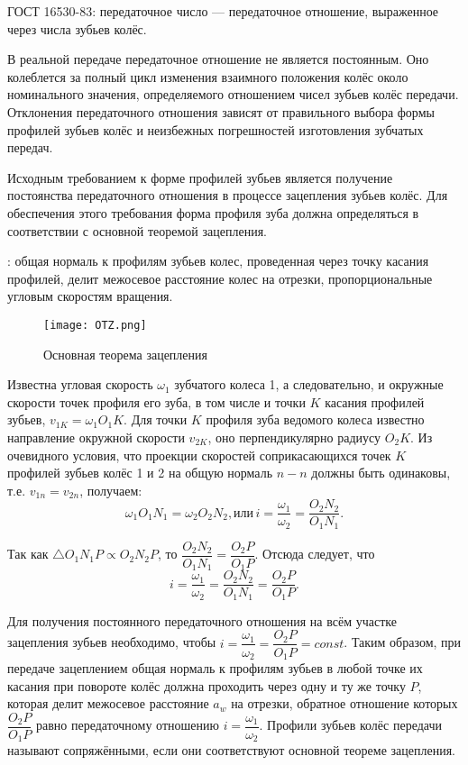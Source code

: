 ГОСТ 16530-83: передаточное число --- передаточное отношение, выраженное через числа зубьев колёс.

В реальной передаче передаточное отношение не является постоянным.
Оно колеблется за полный цикл изменения взаимного положения колёс около номинального значения, определяемого отношением чисел зубьев колёс передачи.
Отклонения передаточного отношения зависят от правильного выбора формы профилей зубьев колёс и неизбежных погрешностей изготовления зубчатых передач.

Исходным требованием к форме профилей зубьев является получение постоянства передаточного отношения в процессе зацепления зубьев колёс. 
Для обеспечения этого требования форма профиля зуба должна определяться в соответствии с основной теоремой зацепления.

: общая нормаль к профилям зубьев колес, проведенная через точку касания профилей, делит межосевое расстояние колес на отрезки, пропорциональные угловым скоростям вращения.


\begin{figure*}[h!]
	\texttt{[image: OTZ.png]}
	\caption{Основная теорема зацепления}
	\label{pic:OTZ}
\end{figure*}

Известна угловая скорость $ \omega_1 $ зубчатого колеса 1, а следовательно, и окружные скорости точек профиля его зуба, в том числе и точки $ K $ касания профилей зубьев, $ v_{1K} = \omega_1 O_1 K $. 
Для точки $ K $ профиля зуба ведомого колеса известно направление окружной скорости $ v_{2K} $, оно перпендикулярно радиусу $ O_2 K $. Из очевидного условия, что проекции скоростей соприкасающихся точек $ K $ профилей зубьев колёс 1 и 2 на общую нормаль $ n-n $ должны быть одинаковы, т.е. $ v_{1n} = v_{2n}$, получаем:
\begin{equation*}
\omega_1 O_1 N_1 = \omega_2 O_2 N_2, \text{или}\, i=\dfrac{\omega_1}{\omega_2} = \dfrac{O_2 N_2}{O_1 N_1}.
\end{equation*}


Так как $ \triangle O_1 N_1 P \propto O_2 N_2 P $, то $ \dfrac{O_2 N_2}{O_1 N_1} = \dfrac{O_2 P}{O_1 P}$. Отсюда следует, что
\begin{equation*}
i=\dfrac{\omega_1}{\omega_2} = \dfrac{O_2 N_2 }{O_1 N_1} = \dfrac{O_2 P}{O_1 P}.
\end{equation*}

Для получения постоянного передаточного отношения на всём участке зацепления зубьев необходимо, чтобы $ i=\dfrac{\omega_1}{\omega_2} = \dfrac{O_2 P}{O_1 P} = const $. 
Таким образом, при передаче зацеплением общая нормаль к профилям зубьев в любой точке их касания при повороте колёс должна проходить через одну и ту же точку $ P $, которая делит межосевое расстояние $ a_w $ на отрезки, обратное отношение которых $ \dfrac{O_2 P}{O_1 P} $ равно передаточному отношению $ i=\dfrac{\omega_1}{\omega_2} $. Профили зубьев колёс передачи называют сопряжёнными, если они соответствуют основной теореме зацепления.

